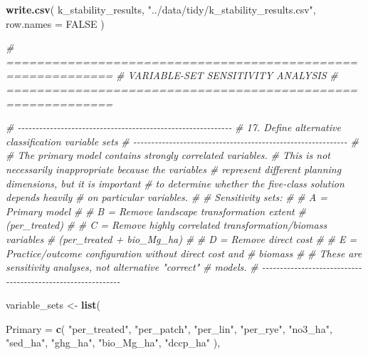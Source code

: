 \documentclass[
]{article}
\newenvironment{Shaded}{\begin{snugshade}}{\end{snugshade}}
\newcommand{\AttributeTok}[1]{\textcolor[rgb]{0.13,0.29,0.53}{#1}}
\newcommand{\CommentTok}[1]{\textcolor[rgb]{0.56,0.35,0.01}{\textit{#1}}}
\newcommand{\ConstantTok}[1]{\textcolor[rgb]{0.56,0.35,0.01}{#1}}
\newcommand{\FunctionTok}[1]{\textcolor[rgb]{0.13,0.29,0.53}{\textbf{#1}}}
\newcommand{\NormalTok}[1]{#1}
\newcommand{\OtherTok}[1]{\textcolor[rgb]{0.56,0.35,0.01}{#1}}
\newcommand{\StringTok}[1]{\textcolor[rgb]{0.31,0.60,0.02}{#1}}
\begin{document}
\begin{Shaded}
\begin{Highlighting}[]
\FunctionTok{write.csv}\NormalTok{(}
\NormalTok{  k\_stability\_results,}
  \StringTok{"../data/tidy/k\_stability\_results.csv"}\NormalTok{,}
  \AttributeTok{row.names =} \ConstantTok{FALSE}
\NormalTok{)}


\CommentTok{\# ============================================================}
\CommentTok{\# VARIABLE{-}SET SENSITIVITY ANALYSIS}
\CommentTok{\# ============================================================}

\CommentTok{\# {-}{-}{-}{-}{-}{-}{-}{-}{-}{-}{-}{-}{-}{-}{-}{-}{-}{-}{-}{-}{-}{-}{-}{-}{-}{-}{-}{-}{-}{-}{-}{-}{-}{-}{-}{-}{-}{-}{-}{-}{-}{-}{-}{-}{-}{-}{-}{-}{-}{-}{-}{-}{-}{-}{-}{-}{-}{-}{-}{-}}
\CommentTok{\# 17. Define alternative classification variable sets}
\CommentTok{\# {-}{-}{-}{-}{-}{-}{-}{-}{-}{-}{-}{-}{-}{-}{-}{-}{-}{-}{-}{-}{-}{-}{-}{-}{-}{-}{-}{-}{-}{-}{-}{-}{-}{-}{-}{-}{-}{-}{-}{-}{-}{-}{-}{-}{-}{-}{-}{-}{-}{-}{-}{-}{-}{-}{-}{-}{-}{-}{-}{-}}
\CommentTok{\#}
\CommentTok{\# The primary model contains strongly correlated variables.}
\CommentTok{\# This is not necessarily inappropriate because the variables}
\CommentTok{\# represent different planning dimensions, but it is important}
\CommentTok{\# to determine whether the five{-}class solution depends heavily}
\CommentTok{\# on particular variables.}
\CommentTok{\#}
\CommentTok{\# Sensitivity sets:}
\CommentTok{\#}
\CommentTok{\# A = Primary model}
\CommentTok{\#}
\CommentTok{\# B = Remove landscape transformation extent}
\CommentTok{\#     (per\_treated)}
\CommentTok{\#}
\CommentTok{\# C = Remove highly correlated transformation/biomass variables}
\CommentTok{\#     (per\_treated + bio\_Mg\_ha)}
\CommentTok{\#}
\CommentTok{\# D = Remove direct cost}
\CommentTok{\#}
\CommentTok{\# E = Practice/outcome configuration without direct cost and}
\CommentTok{\#     biomass}
\CommentTok{\#}
\CommentTok{\# These are sensitivity analyses, not alternative "correct"}
\CommentTok{\# models.}
\CommentTok{\# {-}{-}{-}{-}{-}{-}{-}{-}{-}{-}{-}{-}{-}{-}{-}{-}{-}{-}{-}{-}{-}{-}{-}{-}{-}{-}{-}{-}{-}{-}{-}{-}{-}{-}{-}{-}{-}{-}{-}{-}{-}{-}{-}{-}{-}{-}{-}{-}{-}{-}{-}{-}{-}{-}{-}{-}{-}{-}{-}{-}}

\NormalTok{variable\_sets }\OtherTok{\textless{}{-}} \FunctionTok{list}\NormalTok{(}

  \AttributeTok{Primary =} \FunctionTok{c}\NormalTok{(}
    \StringTok{"per\_treated"}\NormalTok{,}
    \StringTok{"per\_patch"}\NormalTok{,}
    \StringTok{"per\_lin"}\NormalTok{,}
    \StringTok{"per\_rye"}\NormalTok{,}
    \StringTok{"no3\_ha"}\NormalTok{,}
    \StringTok{"sed\_ha"}\NormalTok{,}
    \StringTok{"ghg\_ha"}\NormalTok{,}
    \StringTok{"bio\_Mg\_ha"}\NormalTok{,}
    \StringTok{"dccp\_ha"}
\NormalTok{  ),}


\end{Highlighting}
\end{Shaded}
\end{document}
